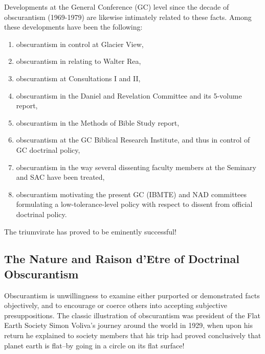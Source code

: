 Developments at the General Conference (GC) level since the decade of
obscurantism (1969-1979) are likewise intimately related to these facts.
Among these developments have been the following:
\begin{enumerate}
	\item obscurantism in control at Glacier View, 
	\item obscurantism in relating to Walter Rea,
	\item obscurantism at Consultations I and II,
	\item obscurantism in the Daniel and Revelation Committee and its 5-volume 
	report, 
	\item obscurantism in the Methods of Bible Study 
	report,
	\item obscurantism at the GC Biblical
	Research Institute, and thus in control of GC doctrinal policy,
	\item obscurantism in the way several dissenting faculty members at the 
	Seminary and SAC have been treated,
	\item obscurantism motivating the present GC
	(IBMTE) and NAD committees formulating a low-tolerance-level policy with
	respect to dissent from official doctrinal policy.
\end{enumerate}
The triumvirate has proved to be eminently successful!

\subsection{The Nature and Raison d'Etre of Doctrinal Obscurantism}

Obscurantism is unwillingness to examine either purported or demonstrated
facts objectively, and to encourage or coerce others into accepting
subjective presuppositions. The classic illustration of obscurantism was
president of the Flat Earth Society Simon Voliva's journey around the world
in 1929, when upon his return he explained to society members that his trip
had proved conclusively that planet earth is flat--by going in a circle on
its flat surface!

